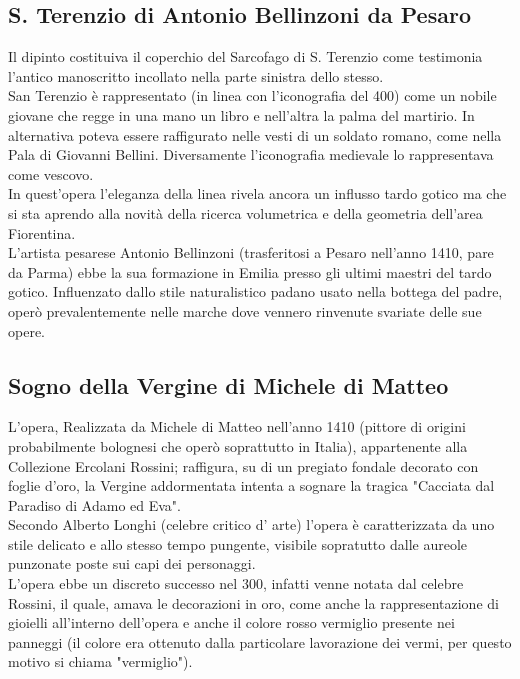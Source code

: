 \documentclass[hidelinks,12pt,a4paper]{article}
\begin{document}
\begin{flushleft}
		\subsection{S. Terenzio di Antonio Bellinzoni da Pesaro}
		Il dipinto costituiva il coperchio del Sarcofago di S. Terenzio come testimonia l’antico manoscritto incollato nella parte sinistra dello stesso.\\
		San Terenzio è rappresentato (in linea con l'iconografia del 400) come un nobile giovane che regge in una mano un libro e nell'altra la palma del martirio. In alternativa poteva essere raffigurato nelle vesti di un soldato romano, come nella Pala di Giovanni Bellini. Diversamente l’iconografia medievale lo rappresentava come vescovo.\\
		In quest'opera l'eleganza della linea rivela ancora un influsso tardo gotico ma che si sta aprendo alla novità della ricerca volumetrica e della geometria dell'area Fiorentina.\\
		L'artista pesarese Antonio Bellinzoni (trasferitosi a Pesaro nell'anno 1410, pare da Parma) ebbe la sua formazione in Emilia presso gli ultimi maestri del tardo gotico. Influenzato dallo stile naturalistico padano usato nella bottega del padre, operò prevalentemente nelle marche dove vennero rinvenute svariate delle sue opere.
		
		\subsection{Sogno della Vergine di Michele di Matteo}
		L'opera, Realizzata da Michele di Matteo nell'anno 1410 (pittore di origini probabilmente bolognesi che operò soprattutto in Italia), appartenente alla Collezione Ercolani Rossini; raffigura, su di un pregiato fondale decorato con foglie d'oro, la Vergine addormentata intenta a sognare la tragica "Cacciata dal Paradiso di Adamo ed Eva".\\
		Secondo Alberto Longhi (celebre critico d’ arte) l'opera è caratterizzata da uno stile delicato e allo stesso tempo pungente, visibile sopratutto dalle aureole punzonate poste sui capi dei personaggi.\\
		L'opera ebbe un discreto successo nel 300, infatti venne notata dal celebre Rossini, il quale, amava le decorazioni in oro, come anche la rappresentazione di gioielli all'interno dell'opera e anche il colore rosso vermiglio presente nei panneggi (il colore era ottenuto dalla particolare lavorazione dei vermi, per questo motivo si chiama "vermiglio").  
		

\end{flushleft}
\end{document}
